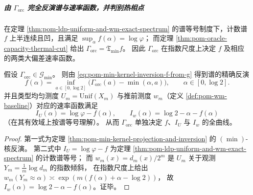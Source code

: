 \subparagraph{由 \texorpdfstring{$\Gamma_{\mathrm{orc}}$}{Gamma\_orc} 完全反演谱与速率函数，并判别热相点}
在定理 \ref{thm:pom-ldp-uniform-and-wm-exact-spectrum} 的谱等号制度下，计数谱 \(f\) 上半连续且凹，且满足
\(
\sup_\alpha f(\alpha)=\log\varphi
\)；
而定理 \ref{thm:pom-oracle-capacity-thermal-cut} 给出
\(
\Gamma_{\mathrm{orc}}=\mathfrak{T}_{\min}f
\)。
因此 \(\Gamma_{\mathrm{orc}}\) 在指数尺度上决定 \(f\) 及相应的两类大偏差速率函数。

\begin{theorem}\label{thm:pom-oracle-tomography-completeness-f-Iu-Iw}
假设 \(\Gamma_{\mathrm{orc}}\in\mathcal{G}_{\min}\)。
则由 \eqref{eq:pom-min-kernel-inversion-f-from-g} 得到谱的精确反演
\[
\boxed{\;
f(\alpha)=\inf_{a\in[0,\log 2]}\bigl(\Gamma_{\mathrm{orc}}(a)-\min(\alpha,a)\bigr),\qquad \alpha\in[0,\log 2].\;}
\]
并且类型均匀测度 \(U_m=\mathrm{Unif}(X_m)\) 与推前测度 \(w_m\)（定义 \ref{def:pom-wm-baseline}）对应的速率函数满足
\[
\boxed{\;
I_U(\alpha)=\log\varphi-f(\alpha),\qquad
I_w(\alpha)=\log 2-\alpha-f(\alpha)\;}
\]
（在其有效域上按谱等号理解）。
从而 \(\Gamma_{\mathrm{orc}}\) 单独决定 \(f\)、\(I_U\) 与 \(I_w\) 的全曲线。
\end{theorem}
\begin{proof}
第一式为定理 \ref{thm:pom-min-kernel-projection-and-inversion} 的 \((\min)\)-核反演。
第二式中 \(I_U=\log\varphi-f\) 为定理 \ref{thm:pom-ldp-uniform-and-wm-exact-spectrum} 的计数谱等号；
而 \(w_m(x)=d_m(x)/2^m\) 是 \(U_m\) 关于观测 \(Y_m=\frac1m\log d_m\) 的指数倾斜，
在指数尺度上给出
\(
w_m(Y_m\approx\alpha)\asymp \exp(m(f(\alpha)+\alpha-\log 2))
\)，
故 \(I_w(\alpha)=\log 2-\alpha-f(\alpha)\)。证毕。
\end{proof}

